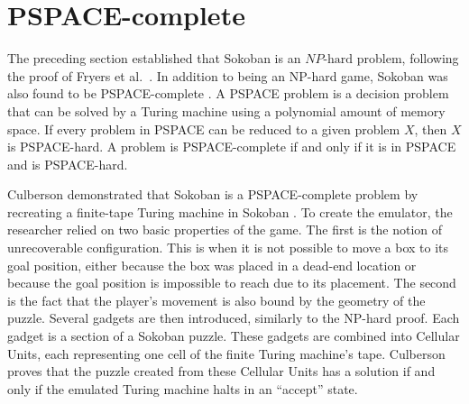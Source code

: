 \section{PSPACE-complete}
The preceding section established that Sokoban is an $NP\text{-hard}$ problem, following the proof of Fryers et al.\ \cite{fryers1995sokoban, cook2023complexity}. In addition to being an NP-hard game, Sokoban was also found to be PSPACE-complete \cite{culberson1997sokoban}. A PSPACE problem is a decision problem that can be solved by a Turing machine using a polynomial amount of memory space. If every problem in PSPACE can be reduced to a given problem $X$, then $X$ is PSPACE-hard. A problem is PSPACE-complete if and only if it is in PSPACE and is PSPACE-hard.

Culberson demonstrated that Sokoban is a PSPACE-complete problem by recreating a finite-tape Turing machine in Sokoban \cite{culberson1997sokoban}. To create the emulator, the researcher relied on two basic properties of the game. The first is the notion of unrecoverable configuration. This is when it is not possible to move a box to its goal position, either because the box was placed in a dead-end location or because the goal position is impossible to reach due to its placement. The second is the fact that the player's movement is also bound by the geometry of the puzzle. Several gadgets are then introduced, similarly to the NP-hard proof. Each gadget is a section of a Sokoban puzzle. These gadgets are combined into Cellular Units, each representing one cell of the finite Turing machine's tape. Culberson proves that the puzzle created from these Cellular Units has a solution if and only if the emulated Turing machine halts in an ``accept'' state.